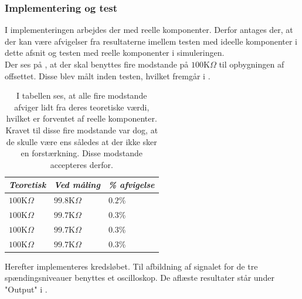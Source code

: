 \subsubsection{Implementering og test}
I implementeringen arbejdes der med reelle komponenter. Derfor antages der, at der kan være afvigelser fra resultaterne imellem testen med ideelle komponenter i dette afsnit og testen med reelle komponenter i simuleringen. \\
Der ses på , at der skal benyttes fire modstande på $100$K$\Omega$ til opbygningen af offsettet. Disse blev målt inden testen, hvilket fremgår i .
\begin{table}[H]
	\centering
	\begin{tabular}{|l|l|l|}
		\hline
		\textit{Teoretisk} & \textit{Ved måling} & \textit{\% afvigelse} \\ \hline
		$100$K$\Omega$       & $99.8$K$\Omega$       & $0.2$\%               \\ \hline
		$100$K$\Omega$       & $99.7$K$\Omega$       & $0.3$\%               \\ \hline
		$100$K$\Omega$       & $99.7$K$\Omega$       & $0.3$\%               \\ \hline
		$100$K$\Omega$       & $99.7$K$\Omega$       & $0.3$\%               \\ \hline
	\end{tabular}
	\caption{I tabellen ses, at alle fire modstande afviger lidt fra deres teoretiske værdi, hvilket er forventet af reelle komponenter. Kravet til disse fire modstande var dog, at de skulle være ens således at der ikke sker en forstærkning. Disse modstande accepteres derfor.}
	\label{Tab:modstand_offset}
\end{table}
\noindent Herefter implementeres kredsløbet. Til afbildning af signalet for de tre spændingsniveauer benyttes et oscilloskop. De aflæste resultater står under "Output" i .
